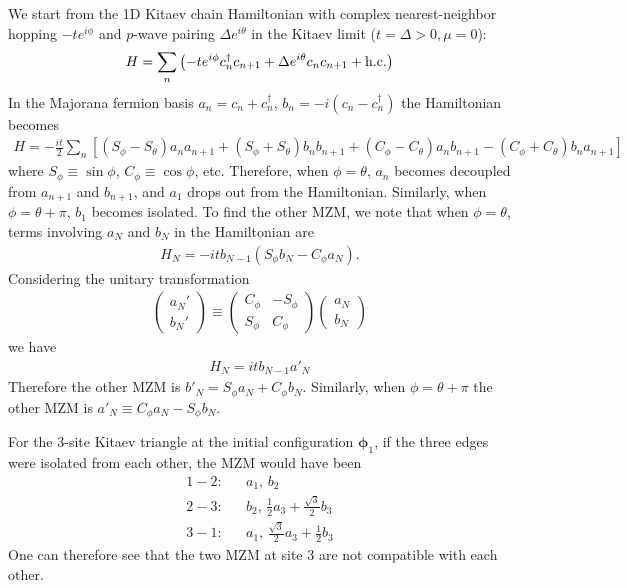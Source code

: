\documentclass[aps,prb,showpacs,amsmath,amssymb,superscriptaddress]{revtex4-2}
\begin{document}
We start from the 1D Kitaev chain Hamiltonian with complex nearest-neighbor hopping $-te^{i\phi}$ and $p$-wave pairing $\Delta e^{i\theta}$ in the Kitaev limit ($t=\Delta > 0, \mu = 0$):
\begin{eqnarray}
	H = \sum_{n}\left(- te^{i\phi}c_n^\dag c_{n+1} + \Delta e^{i\theta}c_nc_{n+1} + {\rm h.c.}\right)
\end{eqnarray}
In the Majorana fermion basis $a_n = c_n + c_n^\dag$, $b_n = -i(c_n - c_n^\dag)$ the Hamiltonian becomes
\begin{eqnarray}
H = -\frac{it}{2} \sum_n \left[(S_\phi - S_\theta) a_n a_{n+1} + (S_\phi + S_\theta)b_n b_{n+1} + (C_\phi - C_\theta) a_n b_{n+1} - (C_\phi + C_\theta)b_na_{n+1}\right]
\end{eqnarray}
where $S_\phi\equiv \sin\phi$, $C_\phi\equiv \cos\phi$, etc. Therefore, when $\phi = \theta$, $a_n$ becomes decoupled from $a_{n+1}$ and $b_{n+1}$, and $a_1$ drops out from the Hamiltonian. Similarly, when $\phi = \theta + \pi$, $b_1$ becomes isolated. To find the other MZM, we note that when $\phi = \theta$, terms involving $a_{N}$ and $b_N$ in the Hamiltonian are
\begin{eqnarray}
	H_N = -itb_{N-1}(S_\phi b_{N} - C_\phi a_N).
\end{eqnarray}
Considering the unitary transformation
\begin{eqnarray}
	\begin{pmatrix}
		a_N' \\
		b_N'
	\end{pmatrix} \equiv\begin{pmatrix}
	C_\phi & - S_\phi\\
	S_\phi & C_\phi
\end{pmatrix}\begin{pmatrix}
a_N\\
b_N
\end{pmatrix}
\end{eqnarray}
we have
\begin{eqnarray}
	H_N = itb_{N-1} a'_N
\end{eqnarray}
Therefore the other MZM is $b'_N = S_\phi a_N + C_\phi b_N$. Similarly, when $\phi = \theta + \pi$ the other MZM is $a'_{N} \equiv C_\phi a_N - S_\phi b_N$.

For the 3-site Kitaev triangle at the initial configuration $\boldsymbol{\phi}_1$, if the three edges were isolated from each other, the MZM would have been
\begin{eqnarray}
	1-2:&& a_1,\,b_2\\\nonumber
	2-3:&& b_2,\,\frac{1}{2}a_3 + \frac{\sqrt{3}}{2}b_3\\\nonumber
	3-1:&& a_1,\, \frac{\sqrt{3}}{2}a_3 + \frac{1}{2} b_3
\end{eqnarray}
One can therefore see that the two MZM at site 3 are not compatible with each other.
\end{document}
